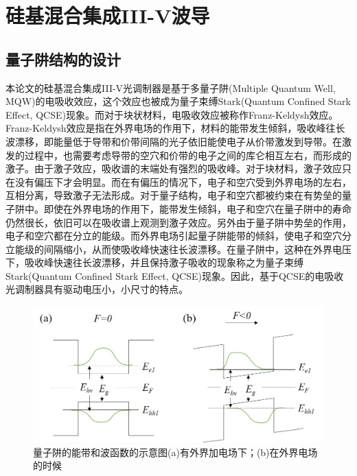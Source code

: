 \chapter{硅基混合集成III-V波导}
\section{量子阱结构的设计}
本论文的硅基混合集成III-V光调制器是基于多量子阱(Multiple Quantum Well, MQW)的电吸收效应，这个效应也被成为量子束缚Stark(Quantum Confined Stark Effect, QCSE)现象。而对于块状材料，电吸收效应被称作Franz-Keldysh效应\cite{keldysh1958effect,franz1958einfluss}。Franz-Keldysh效应是指在外界电场的作用下，材料的能带发生倾斜，吸收峰往长波漂移，即能量低于导带和价带间隔的光子依旧能使电子从价带激发到导带。在激发的过程中，也需要考虑导带的空穴和价带的电子之间的库仑相互左右，而形成的激子。由于激子效应，吸收谱的末端处有强烈的吸收峰。对于块材料，激子效应只在没有偏压下才会明显。而在有偏压的情况下，电子和空穴受到外界电场的左右，互相分离，导致激子无法形成。对于量子结构，电子和空穴都被约束在有势垒的量子阱中。即使在外界电场的作用下，能带发生倾斜，电子和空穴在量子阱中的寿命仍然很长，依旧可以在吸收谱上观测到激子效应。另外由于量子阱中势垒的作用，电子和空穴都在分立的能级。而外界电场引起量子阱能带的倾斜，使电子和空穴分立能级的间隔缩小，从而使吸收峰快速往长波漂移。在量子阱中，这种在外界电压下，吸收峰快速往长波漂移，并且保持激子吸收的现象称之为量子束缚Stark(Quantum Confined Stark Effect, QCSE)现象\cite{miller1984band,miller1985electric}。因此，基于QCSE的电吸收光调制器具有驱动电压小，小尺寸的特点。

\begin{figure}[htb]
	\centering
	\includegraphics[width=14cm]{./Pictures/fig_ch2_band_lineup.jpg}
	\caption{ 量子阱的能带和波函数的示意图(a)有外界加电场下；(b)在外界电场的时候}
	\label{fig_ch2_band_lineup}
\end{figure}


